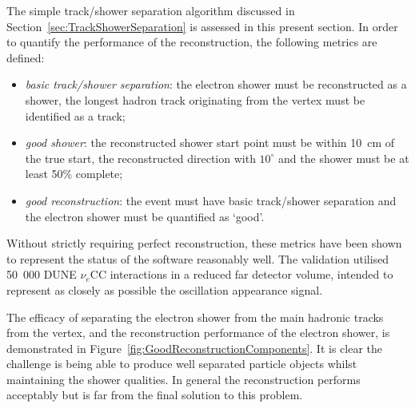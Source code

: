 The simple track/shower separation algorithm discussed in Section~\ref{sec:TrackShowerSeparation} is assessed in this present section.  In order to quantify the performance of the reconstruction, the following metrics are defined:
\begin{itemize}
  \item \textit{basic track/shower separation}: the electron shower must be reconstructed as a shower, the longest hadron track originating from the vertex must be identified as a track;
  \item \textit{good shower}: the reconstructed shower start point must be within 10~cm of the true start, the reconstructed direction with $10^{\circ}$ and the shower must be at least 50\% complete;
  \item \textit{good reconstruction}: the event must have basic track/shower separation and the electron shower must be quantified as `good'.
\end{itemize}
Without strictly requiring perfect reconstruction, these metrics have been shown to represent the status of the software reasonably well.  The validation utilised 50~000 DUNE $\nu_e$CC interactions in a reduced far detector volume, intended to represent as closely as possible the oscillation appearance signal.

The efficacy of separating the electron shower from the main hadronic tracks from the vertex, and the reconstruction performance of the electron shower, is demonstrated in Figure~\ref{fig:GoodReconstructionComponents}.  It is clear the challenge is being able to produce well separated particle objects whilst maintaining the shower qualities.  In general the reconstruction performs acceptably but is far from the final solution to this problem.


